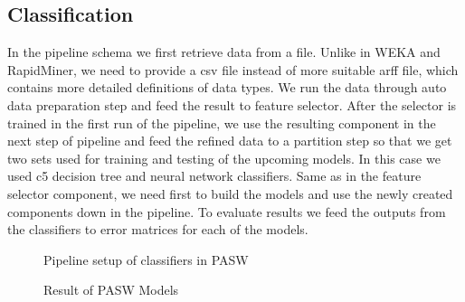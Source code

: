 \documentclass[11pt]{article}
\begin{document}
\subsection{Classification}
In the pipeline schema we first retrieve data from a file. Unlike in WEKA and
RapidMiner, we need to provide a csv file instead of more suitable arff file,
which contains more detailed definitions of data types. We run the data through
auto data preparation step and feed the result to feature selector. After the
selector is trained in the first run of the pipeline, we use the resulting
component in the next step of pipeline and feed the refined data to a partition
step so that we get two sets used for training and testing of the upcoming
models. In this case we used c5 decision tree and neural network classifiers.
Same as in the feature selector component, we need first to build the models
and use the newly created components down in the pipeline. To evaluate results
we feed the outputs from the classifiers to error matrices for each of the
models.


\begin{figure}[!ht]
	\centering
    \caption{Pipeline setup of classifiers in PASW}

\end{figure}

\begin{figure}[!ht]
	\centering
    \caption{Result of PASW Models}
\end{figure}
\end{document}

